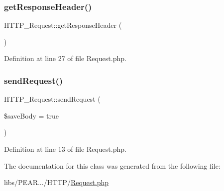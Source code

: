 \subsubsection{\texorpdfstring{get\+Response\+Header()}{getResponseHeader()}}
{\footnotesize\ttfamily H\+T\+T\+P\+\_\+\+Request\+::get\+Response\+Header (\begin{DoxyParamCaption}{ }\end{DoxyParamCaption})}



Definition at line 27 of file Request.\+php.

\mbox{\label{classHTTP__Request_af3e8b1423f6a2858652063c4a6f697a0}} 
\subsubsection{\texorpdfstring{send\+Request()}{sendRequest()}}
{\footnotesize\ttfamily H\+T\+T\+P\+\_\+\+Request\+::send\+Request (\begin{DoxyParamCaption}\item[{}]{\$save\+Body = {\ttfamily true} }\end{DoxyParamCaption})}



Definition at line 13 of file Request.\+php.



The documentation for this class was generated from the following file\+:\begin{DoxyCompactItemize}
\item 
libs/\+P\+E\+A\+R.../\+H\+T\+T\+P/\hyperlink{Request_8php}{Request.\+php}\end{DoxyCompactItemize}
